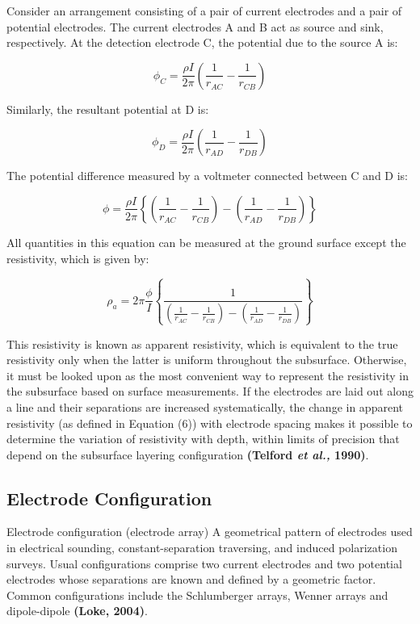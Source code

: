 \documentclass[12pt,a4paper]{report}
\begin{document}
Consider an arrangement consisting of a pair of current electrodes and a pair of potential electrodes. The current electrodes A and B act as source and sink, respectively. At the detection electrode C, the potential due to the source A is:

\begin{equation}
\phi_{C} = \frac{\rho I}{2\pi} \left( \frac{1}{r_{AC}} - \frac{1}{r_{CB}} \right)
\end{equation}

Similarly, the resultant potential at D is:

\begin{equation}
\phi_{D} = \frac{\rho I}{2\pi} \left( \frac{1}{r_{AD}} - \frac{1}{r_{DB}} \right)
\end{equation}

The potential difference measured by a voltmeter connected between C and D is:

\begin{equation}
\phi = \frac{\rho I}{2\pi} \left\{ \left( \frac{1}{r_{AC}} - \frac{1}{r_{CB}} \right) - \left( \frac{1}{r_{AD}} - \frac{1}{r_{DB}} \right) \right\}
\end{equation}

All quantities in this equation can be measured at the ground surface except the resistivity, which is given by:

\begin{equation}
\rho_a = 2\pi \frac{\phi}{I} \left\{ \frac{1}{\left( \frac{1}{r_{AC}} - \frac{1}{r_{CB}} \right) - \left( \frac{1}{r_{AD}} - \frac{1}{r_{DB}} \right)} \right\}
\end{equation}

This resistivity is known as apparent resistivity, which is equivalent to the true resistivity only when the latter is uniform throughout the subsurface. Otherwise, it must be looked upon as the most convenient way to represent the resistivity in the subsurface based on surface measurements. If the electrodes are laid out along a line and their separations are increased systematically, the change in apparent resistivity (as defined in Equation (6)) with electrode spacing makes it possible to determine the variation of resistivity with depth, within limits of precision that depend on the subsurface layering configuration \textbf{(Telford \textit{et al.,} 1990)}.

\subsection{Electrode Configuration}
Electrode configuration (electrode array) A geometrical pattern of electrodes used in electrical sounding, constant-separation traversing, and induced polarization surveys. Usual configurations comprise two current electrodes and two potential electrodes whose separations are known and defined by a geometric factor. Common configurations include the Schlumberger arrays, Wenner arrays and dipole-dipole \textbf{(Loke, 2004)}.
\end{document}
